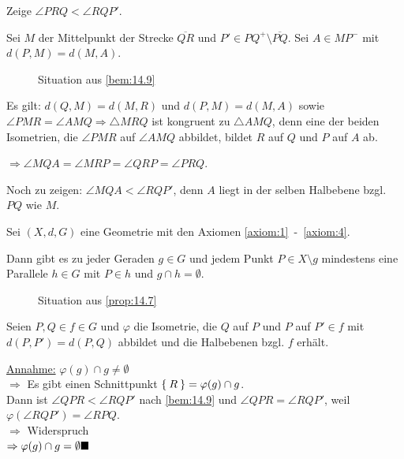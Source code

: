 \begin{beweis}
    Zeige $\angle PRQ < \angle RQP'$.

    Sei $M$ der Mittelpunkt der Strecke $\overline{QR}$ und $P' \in PQ^+ \setminus \overline{PQ}$.
    Sei $A \in MP^-$ mit $d(P,M) = d(M,A)$.


    \begin{figure}[ht]
        \centering

        \label{fig:winkel-und-parallelogramm}
        \caption{Situation aus \cref{bem:14.9}}
    \end{figure}

    Es gilt: $d(Q,M) = d(M,R)$ und $d(P,M) = d(M,A)$ sowie 
    $\angle PMR = \angle AMQ \Rightarrow \triangle MRQ$ ist
    kongruent zu $\triangle AMQ$, denn eine der beiden Isometrien, die
    $\angle PMR$ auf $\angle AMQ$ abbildet, bildet $R$ auf $Q$ und
    $P$ auf $A$ ab.

    $\Rightarrow \angle MQA = \angle MRP = \angle QRP = \angle PRQ$.

    Noch zu zeigen: $\angle MQA < \angle RQP'$, denn $A$ liegt in der
    selben Halbebene bzgl. $PQ$ wie $M$.
\end{beweis}

\begin{proposition}\label{prop:14.7}%
    Sei $(X, d, G)$ eine Geometrie mit den Axiomen \ref{axiom:1}~-~\ref{axiom:4}.

    Dann gibt es zu jeder Geraden $g \in G$ und jedem Punkt $P \in X \setminus g$ 
    mindestens eine Parallele $h \in G$ mit $P \in h$ und $g \cap h = \emptyset$.
\end{proposition}

\begin{figure}[htp]
    \centering
    
    \caption{Situation aus \cref{prop:14.7}}
    \label{fig:geometry-6}
\end{figure}

\begin{beweis}
    Seien $P, Q \in f \in G$ und $\varphi$ die Isometrie, die $Q$ auf $P$ und $P$ auf $P' \in f$
    mit $d(P,P') = d(P, Q)$ abbildet und die Halbebenen bzgl. $f$ erhält.

    \underline{Annahme:} $\varphi(g) \cap g \neq \emptyset$\\
    $\Rightarrow$ Es gibt einen Schnittpunkt $\Set{R} = \varphi(g) \cap g$.\\
    Dann ist $\angle QPR < \angle RQP'$ nach
    \cref{bem:14.9} und $\angle QPR = \angle RQP'$, weil
    $\varphi(\angle RQP') = \angle RPQ$.\\
    $\Rightarrow$ Widerspruch\\
    $\Rightarrow \varphi(g) \cap g = \emptyset \qed$
\end{beweis}

